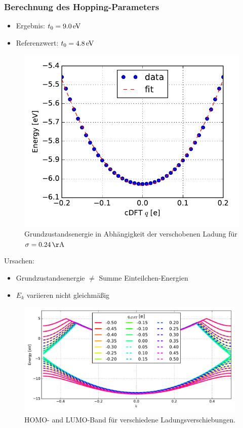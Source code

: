 \begin{frame}
\frametitle{Berechnung des Hopping-Parameters}
\begin{minipage}{0.49\textwidth}
\begin{itemize}
\setlength{\itemsep}{.5cm}
\item Ergebnis: $t_0 = \unit[9.0]{eV}$
\item Referenzwert: $t_0 = \unit[4.8]{eV}$
\end{itemize}
\end{minipage}
\begin{minipage}{0.49\textwidth}
\begin{figure}
\centering
\includegraphics[width = \textwidth]{Images/Hydrogen/charging/energy_fit_normal_sigma}
\caption{Grundzustandsenergie in Abhängigkeit der verschobenen Ladung für $\sigma = \unit[0.24]{\AA}$}
\label{}
\end{figure}
\end{minipage}
\end{frame}

\begin{frame}
Ursachen:
\begin{itemize}
\item Grundzustandsenergie $\neq$ Summe Einteilchen-Energien
\item $E_k$ variieren nicht gleichmäßig
\end{itemize}
\begin{figure}
\centering
\includegraphics[width = 11cm]{Images/Hydrogen/charging/band_structure_q_1}
\caption{HOMO- and LUMO-Band für verschiedene Ladungsverschiebungen.}
\label{image_hydrogen_charged_bands}
\end{figure}
\end{frame}

